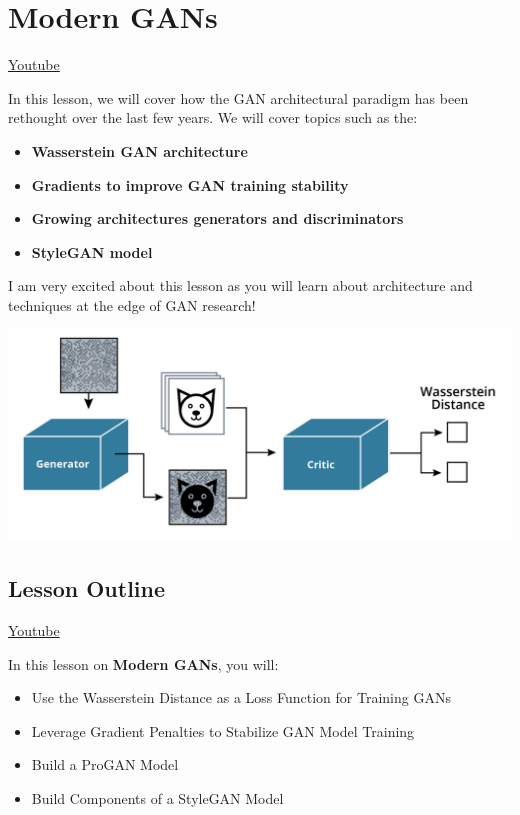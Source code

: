 \chapter{Modern GANs}

\href{https://www.youtube.com/watch?v=3m-ZsIr1Wjs}{Youtube} \newline

In this lesson, we will cover how the GAN architectural paradigm has been rethought over the last few years. We will cover topics such as the:

\begin{itemize}
    \item \textbf{Wasserstein GAN architecture}
    \item \textbf{Gradients to improve GAN training stability}
    \item \textbf{Growing architectures generators and discriminators}
    \item \textbf{StyleGAN model}
\end{itemize}
I am very excited about this lesson as you will learn about architecture and techniques at the edge of GAN research!

\includegraphics[width=0.75\linewidth]{img//genAdvNet//modernGAN/screen-shot-2022-05-12-at-12.06.29-pm.jpeg}

\section{Lesson Outline}
\href{https://www.youtube.com/watch?v=z4ylfVBgHW8&t=3s}{Youtube} \newline

In this lesson on \textbf{Modern GANs}, you will:

\begin{itemize}
    \item Use the Wasserstein Distance as a Loss Function for Training GANs
    \item Leverage Gradient Penalties to Stabilize GAN Model Training
    \item Build a ProGAN Model
    \item Build Components of a StyleGAN Model
\end{itemize}

